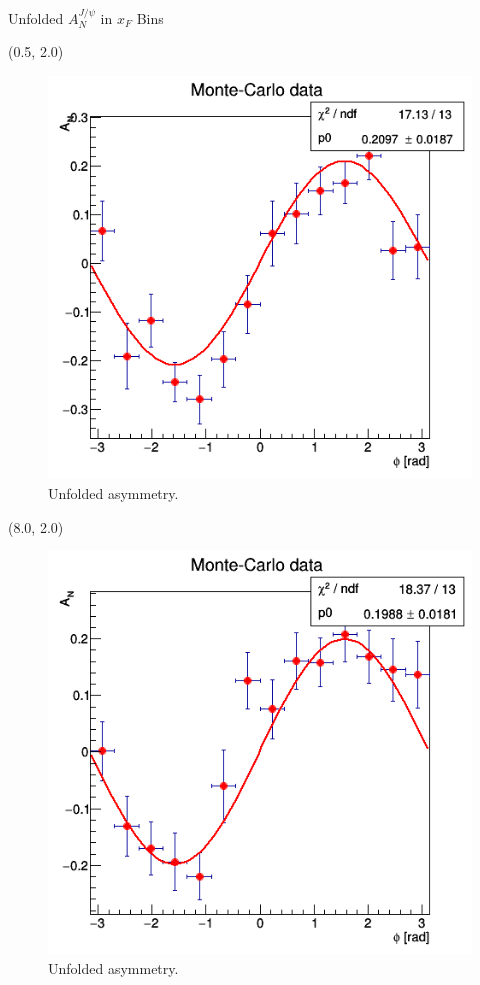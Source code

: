 \documentclass[10pt, xcolor={dvipsnames}, aspectratio = 169]{beamer}
\begin{document}
\begin{frame}{Unfolded $A^{J/\psi}_{N}$ in $x_{F}$ Bins}

\begin{textblock}{7.0}(0.5, 2.0)
\begin{figure}
    \centering
    \includegraphics[width = 1.0\linewidth]{imgs/sigal_asym_xf0.png}
    \caption{Unfolded asymmetry.}
\end{figure}
\end{textblock}

\begin{textblock}{7.0}(8.0, 2.0)
\begin{figure}
    \centering
    \includegraphics[width = 1.0\linewidth]{imgs/sigal_asym_xf1.png}
    \caption{Unfolded asymmetry.}
\end{figure}
\end{textblock}


\end{frame}
\end{document}
